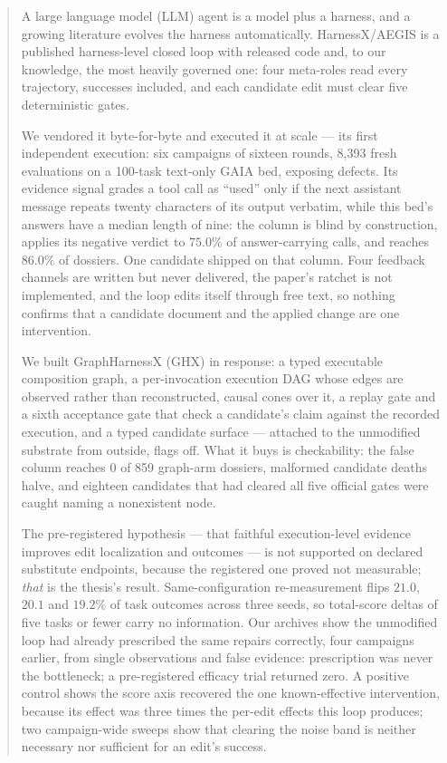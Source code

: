 \begin{abstract}
\singlespacing\noindent
A large language model (LLM) agent is a model plus a harness, and a
growing literature evolves the harness automatically. HarnessX/AEGIS is a
published harness-level closed loop with released code and, to our
knowledge, the most heavily governed one: four meta-roles read every trajectory, successes
included, and each candidate edit must clear five deterministic gates.

We vendored it byte-for-byte and executed it at scale --- its first
independent execution: six campaigns of sixteen rounds, 8{,}393 fresh
evaluations on a 100-task text-only GAIA bed, exposing defects. Its evidence signal grades a tool
call as ``used'' only if the next assistant message repeats twenty
characters of its output verbatim, while this bed's answers have a median
length of nine: the column is blind by construction, applies its negative
verdict to $75.0\%$ of answer-carrying calls, and reaches $86.0\%$ of
dossiers. One candidate shipped on that column. Four feedback channels are
written but never delivered, the paper's ratchet is not implemented, and
the loop edits itself through free text, so nothing confirms that a
candidate document and the applied change are one intervention.

We built GraphHarnessX (GHX) in response: a typed executable composition
graph, a per-invocation execution DAG whose edges are observed rather than
reconstructed, causal cones over it, a replay gate and a sixth acceptance
gate that check a candidate's claim against the recorded execution, and a
typed candidate surface --- attached to the unmodified
substrate from outside, flags off. What it buys is
checkability: the false column reaches 0 of 859 graph-arm dossiers,
malformed candidate deaths halve, and eighteen candidates that had cleared
all five official gates were caught naming a nonexistent node.

The pre-registered hypothesis --- that faithful execution-level evidence
improves edit localization and outcomes --- is not supported on declared
substitute endpoints, because the registered one proved not measurable;
\emph{that} is the thesis's result. Same-configuration re-measurement flips $21.0$,
$20.1$ and $19.2\%$ of task outcomes across three seeds, so total-score
deltas of five tasks or fewer carry no information. Our archives show
the unmodified loop had already prescribed the same repairs correctly,
four campaigns earlier, from single observations and false evidence:
prescription was never the bottleneck; a pre-registered efficacy trial
returned zero. A positive control shows the score
axis recovered the one known-effective intervention, because
its effect was three times the per-edit effects this loop produces;
two campaign-wide sweeps show that clearing the noise band is neither
necessary nor sufficient for an edit's success.


\end{abstract}
